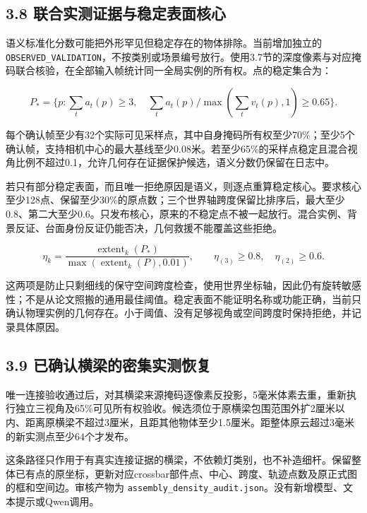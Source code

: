 \documentclass[UTF8,fontset=fandol]{ctexart}
\begin{document}
\subsection*{3.8 联合实测证据与稳定表面核心}

语义标准化分数可能把外形罕见但稳定存在的物体排除。当前增加独立的 \texttt{OBSERVED\_\allowbreak{}VALIDATION}，不按类别或场景编号放行。使用3.7节的深度像素与对应掩码联合核验，在全部输入帧统计同一全局实例的所有权。点的稳定集合为：



\[
P_* = \{p:\sum_t a_t(p)\ge3,\quad \sum_t a_t(p)/\max(\sum_t v_t(p),1)\ge0.65\}.
\]

每个确认帧至少有32个实际可见采样点，其中自身掩码所有权至少70\%；至少5个确认帧，支持相机中心的最大基线至少0.08米。若至少65\%的采样点稳定且混合视角比例不超过0.1，允许几何存在证据保护候选，语义分数仍保留在日志中。



若只有部分稳定表面，而且唯一拒绝原因是语义，则逐点重算稳定核心。要求核心至少128点、保留至少30\%的原点数；三个世界轴跨度保留比排序后，最大至少0.8、第二大至少0.6。只发布核心，原来的不稳定点不被一起放行。混合实例、背景反证、台面身份反证仍能否决，几何救援不能覆盖这些拒绝。



\[
\eta_k=\frac{\operatorname{extent}_k(P_*)}{\max(\operatorname{extent}_k(P),0.01)},\qquad
\eta_{(3)}\ge0.8,\quad \eta_{(2)}\ge0.6.
\]

这两项是防止只剩细线的保守空间跨度检查，使用世界坐标轴，因此仍有旋转敏感性；不是从论文照搬的通用最佳阈值。稳定表面不能证明名称或功能正确，当前只确认物理实例的几何存在。小于阈值、没有足够视角或空间跨度时保持拒绝，并记录具体原因。



\subsection*{3.9 已确认横梁的密集实测恢复}

唯一连接验收通过后，对其横梁来源掩码逐像素反投影，5毫米体素去重，重新执行独立三视角及65\%可见所有权验收。候选须位于原横梁包围范围外扩2厘米以内、距离原横梁不超过3厘米，且距其他物体至少1.5厘米。距整体原云超过3毫米的新实测点至少64个才发布。



这条路径只作用于有真实连接证据的横梁，不依赖灯类别，也不补造细杆。保留整体已有点的原坐标，更新对应crossbar部件点、中心、跨度、轨迹点数及原正式图的框和空间边。审核产物为 \texttt{assembly\_\allowbreak{}density\_\allowbreak{}audit.\allowbreak{}json}。没有新增模型、文本提示或Qwen调用。
\end{document}
